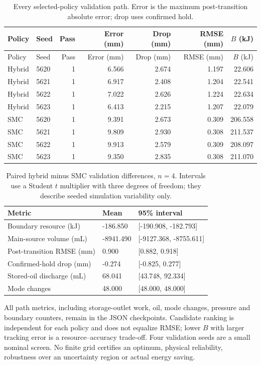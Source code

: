 \begin{longtable}{llrrrrr}
\caption{Every selected-policy validation path. Error is the maximum post-transition absolute error; drop uses confirmed hold.}\\\toprule
Policy & Seed & Pass & Error (mm) & Drop (mm) & RMSE (mm) & $B$ (kJ)\\\midrule\endfirsthead
\toprule Policy & Seed & Pass & Error (mm) & Drop (mm) & RMSE (mm) & $B$ (kJ)\\\midrule\endhead
Hybrid & 5620 & 1 & 6.566 & 2.674 & 1.197 & 22.606 \\
Hybrid & 5621 & 1 & 6.917 & 2.408 & 1.204 & 22.541 \\
Hybrid & 5622 & 1 & 7.022 & 2.626 & 1.224 & 22.634 \\
Hybrid & 5623 & 1 & 6.413 & 2.215 & 1.207 & 22.079 \\
SMC & 5620 & 1 & 9.391 & 2.673 & 0.309 & 206.558 \\
SMC & 5621 & 1 & 9.809 & 2.930 & 0.308 & 211.537 \\
SMC & 5622 & 1 & 9.913 & 2.579 & 0.309 & 208.097 \\
SMC & 5623 & 1 & 9.350 & 2.835 & 0.308 & 211.070 \\
\bottomrule\end{longtable}\endgroup
\begin{table}[H]\centering\small
\caption{Paired hybrid minus SMC validation differences, $n=4$. Intervals use a Student $t$ multiplier with three degrees of freedom; they describe seeded simulation variability only.}
\begin{tabularx}{\linewidth}{@{}>{\raggedright\arraybackslash}p{.48\linewidth}XX@{}}\toprule
Metric & Mean & 95\% interval\\\midrule
Boundary resource (kJ) & -186.850 & [-190.908, -182.793] \\
Main-source volume (mL) & -8941.490 & [-9127.368, -8755.611] \\
Post-transition RMSE (mm) & 0.900 & [0.882, 0.918] \\
Confirmed-hold drop (mm) & -0.274 & [-0.825, 0.277] \\
Stored-oil discharge (mL) & 68.041 & [43.748, 92.334] \\
Mode changes & 48.000 & [48.000, 48.000] \\
\bottomrule\end{tabularx}\end{table}
All path metrics, including storage-outlet work, oil, mode changes, pressure and boundary counters, remain in the JSON checkpoints. Candidate ranking is independent for each policy and does not equalize RMSE; lower $B$ with larger tracking error is a resource--accuracy trade-off. Four validation seeds are a small nominal screen. No finite grid certifies an optimum, physical reliability, robustness over an uncertainty region or actual energy saving.
